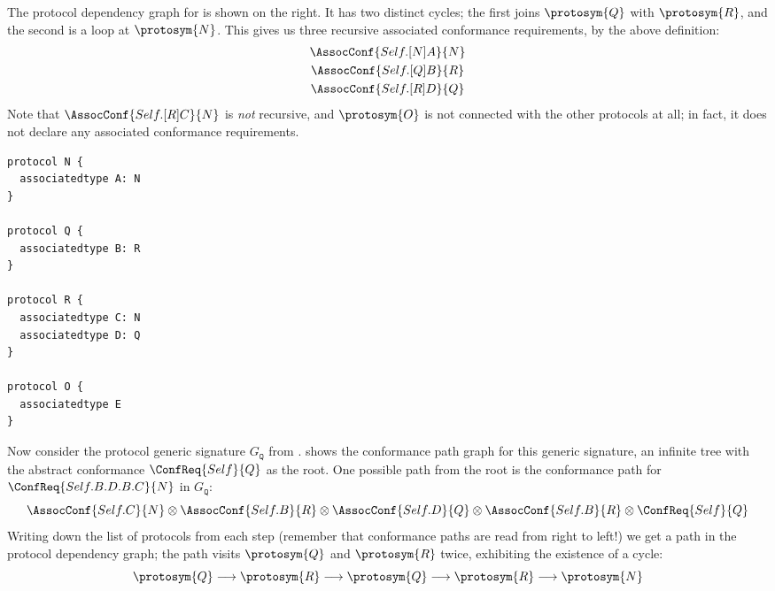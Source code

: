 \documentclass[../generics]{subfiles}
\begin{document}
\smallskip

\begin{figure}
\end{figure}
The protocol dependency graph for  is shown on the right. It has two distinct cycles; the first joins $\protosym{Q}$ with $\protosym{R}$, and the second is a loop at $\protosym{N}$. This gives us three recursive associated conformance requirements, by the above definition:
\begin{gather*}
\AssocConf{Self.[N]A}{N}\\
\AssocConf{Self.[Q]B}{R}\\
\AssocConf{Self.[R]D}{Q}
\end{gather*}
Note that $\AssocConf{Self.[R]C}{N}$ is \emph{not} recursive, and $\protosym{O}$ is not connected with the other protocols at all; in fact, it does not declare any associated conformance requirements.

\smallskip

\begin{listing}\label{protocol dependency graph listing}
\begin{Verbatim}
protocol N {
  associatedtype A: N
}

protocol Q {
  associatedtype B: R
}

protocol R {
  associatedtype C: N
  associatedtype D: Q
}

protocol O {
  associatedtype E
}
\end{Verbatim}
\end{listing}

Now consider the protocol generic signature $G_\texttt{Q}$ from .  shows the conformance path graph for this generic signature, an infinite tree with the abstract conformance $\ConfReq{Self}{Q}$ as the root. One possible path from the root is the conformance path for $\ConfReq{Self.B.D.B.C}{N}$ in $G_\texttt{Q}$:
\[
\AssocConf{Self.C}{N} \otimes \AssocConf{Self.B}{R} \otimes \AssocConf{Self.D}{Q} \otimes \AssocConf{Self.B}{R} \otimes \ConfReq{Self}{Q}
\]
Writing down the list of protocols from each step (remember that conformance paths are read from right to left!) we get a path in the protocol dependency graph; the path visits $\protosym{Q}$ and $\protosym{R}$ twice, exhibiting the existence of a cycle:
\[\protosym{Q}\longrightarrow\protosym{R}\longrightarrow\protosym{Q}\longrightarrow\protosym{R}\longrightarrow\protosym{N}\]
\end{document}
